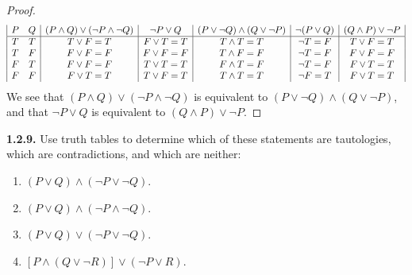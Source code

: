\documentclass[12pt]{amsart}
\newenvironment{statement}[1]{\smallskip\noindent\color[rgb]{.6627, .3529, .6314} {\bf #1.}}{}
\theoremstyle{definition}
\theoremstyle{remark}
\begin{document}
\begin{proof}
\begin{equation*}
	\begin{array}{| c c | c | c | c | c | c |}
		P & Q & (P \wedge Q) \vee (\neg P \wedge \neg Q) & \neg P \vee Q
		& (P \vee \neg Q) \wedge (Q \vee \neg P) & \neg (P \vee Q) & (Q \wedge P) \vee \neg P \\
		\hline
		T & T & T \vee F = T & F \vee T = T & T \wedge T = T & \neg T = F & T \vee F = T \\
		T & F & F \vee F = F & F \vee F = F & T \wedge F = F & \neg T = F & F \vee F = F \\
		F & T & F \vee F = F & T \vee T = T & F \wedge T = F & \neg T = F & F \vee T = T \\
		F & F & F \vee T = T & T \vee F = T & T \wedge T = T & \neg F = T & F \vee T = T
	\end{array}
\end{equation*}
We see that $(P \wedge Q) \vee (\neg P \wedge \neg Q)$ is equivalent to $(P \vee \neg Q) \wedge (Q \vee \neg P)$, and that $\neg P \vee Q$ is equivalent to $(Q \wedge P) \vee \neg P$.
\end{proof}


\begin{statement}{1.2.9}
Use truth tables to determine which of these statements are tautologies, which are contradictions, and which are neither:
\begin{enumerate}
	\item $(P \vee Q) \wedge (\neg P \vee \neg Q)$.
	\item $(P \vee Q) \wedge (\neg P \wedge \neg Q)$.
	\item $(P \vee Q) \vee (\neg P \vee \neg Q)$.
	\item $[P \wedge (Q \vee \neg R)] \vee (\neg P \vee R)$.
\end{enumerate}
\end{statement}
\end{document}
